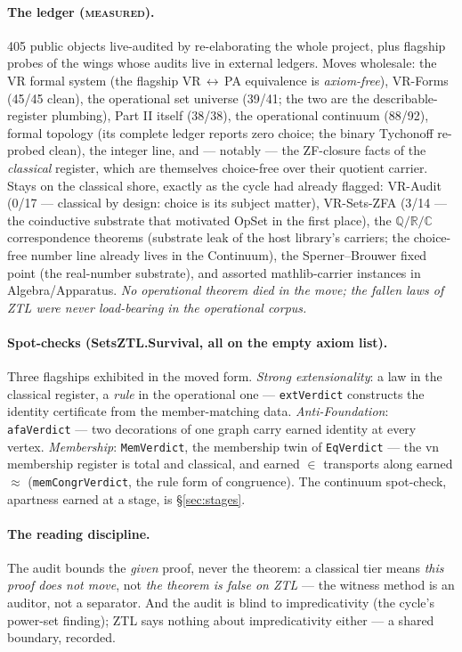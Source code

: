 \documentclass[11pt]{article}
\theoremstyle{remark}
\newcommand{\OpSet}{\textsf{OpSet}}
\newcommand{\eq}{\approx}
\newcommand{\MEASURED}{\textsc{measured}}
\begin{document}
\paragraph{The ledger (\MEASURED).} 405 public objects live-audited by
re-elaborating the whole project, plus flagship probes of the wings whose
audits live in external ledgers. Moves wholesale: the VR formal system (the
flagship VR$\,\leftrightarrow\,$PA equivalence is \emph{axiom-free}),
VR-Forms (45/45 clean), the operational set universe (39/41; the two are
the describable-register plumbing), Part II itself (38/38), the operational
continuum (88/92), formal topology (its complete ledger reports zero
choice; the binary Tychonoff re-probed clean), the integer line, and ---
notably --- the ZF-closure facts of the \emph{classical} register, which
are themselves choice-free over their quotient carrier. Stays on the
classical shore, exactly as the cycle had already flagged: VR-Audit (0/17
--- classical by design: choice is its subject matter), VR-Sets-ZFA (3/14
--- the coinductive substrate that motivated \OpSet{} in the first place),
the $\mathbb{Q}/\mathbb{R}/\mathbb{C}$ correspondence theorems (substrate
leak of the host library's carriers; the choice-free number line already
lives in the Continuum), the Sperner--Brouwer fixed point (the real-number
substrate), and assorted mathlib-carrier instances in Algebra/Apparatus.
\emph{No operational theorem died in the move; the fallen laws of ZTL were
never load-bearing in the operational corpus.}

\paragraph{Spot-checks (\textsf{SetsZTL.Survival}, all on the empty axiom
list).} Three flagships exhibited in the moved form. \emph{Strong
extensionality}: a law in the classical register, a \emph{rule} in the
operational one --- \texttt{extVerdict} constructs the identity certificate
from the member-matching data. \emph{Anti-Foundation}: \texttt{afaVerdict}
--- two decorations of one graph carry earned identity at every vertex.
\emph{Membership}: \texttt{MemVerdict}, the membership twin of
\texttt{EqVerdict} --- the vn membership register is total and classical,
and earned $\in$ transports along earned $\eq$ (\texttt{memCongrVerdict},
the rule form of congruence). The continuum spot-check, apartness earned at
a stage, is \S\ref{sec:stages}.

\paragraph{The reading discipline.} The audit bounds the \emph{given}
proof, never the theorem: a classical tier means \emph{this proof does not
move}, not \emph{the theorem is false on ZTL} --- the witness method is an
auditor, not a separator. And the audit is blind to impredicativity (the
cycle's power-set finding); ZTL says nothing about impredicativity either
--- a shared boundary, recorded.
\end{document}
